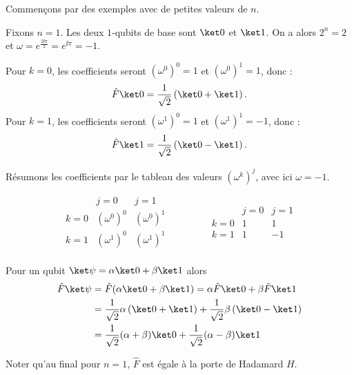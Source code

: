 \documentclass[11pt,class=report,crop=false]{standalone}
\begin{document}
Commençons par des exemples avec de petites valeurs de $n$.

\begin{exemple}
Fixons $n=1$. Les deux $1$-qubits de base sont $\ket0$ et $\ket1$.
On a alors $2^n = 2$ et $\omega = e^{\frac{2\ii\pi}{2}} = e^{\ii\pi} = -1$.

Pour $k=0$, les coefficients seront $(\omega^0)^0=1$ et $(\omega^0)^1=1$, donc :
$$\hat F \ket0 = \frac{1}{\sqrt2} \left(\ket0 + \ket1\right).$$
Pour $k=1$, les coefficients seront $(\omega^1)^0=1$ et $(\omega^1)^1=-1$, donc :
$$\hat F \ket1 = \frac{1}{\sqrt2} \left(\ket0 - \ket1\right).$$

Résumons les coefficients par le tableau des valeurs $(\omega^k)^j$, avec ici $\omega=-1$.
\begin{center}
$$\begin{array}{c|cc}
      & j=0 & j=1 \\ \hline
k = 0 & (\omega^0)^0 & (\omega^0)^1 \\
k = 1 & (\omega^1)^0 & (\omega^1)^1 \\
\end{array}
\qquad\qquad
\begin{array}{c|cc}
      & j=0 & j=1 \\ \hline
k = 0 & 1 & 1 \\
k = 1 & 1 & -1 \\
\end{array}$$
\end{center}

Pour un qubit $\ket\psi = \alpha\ket0 + \beta\ket1$ alors
\begin{align*}
\hat F \ket\psi 
  &= \hat F(\alpha\ket0 + \beta\ket1)
   = \alpha\hat F\ket0 + \beta\hat F\ket1 \\
  &= \frac{1}{\sqrt2} \alpha\left(\ket0 + \ket1\right) + \frac{1}{\sqrt2}\beta\left(\ket0 - \ket1\right) \\
  &= \frac{1}{\sqrt2}(\alpha+\beta)\ket0 + 
\frac{1}{\sqrt2}(\alpha-\beta)\ket1
\end{align*}

Noter qu'au final pour $n=1$, $\hat F$ est égale à la porte de Hadamard $H$.
\end{exemple}
\end{document}
